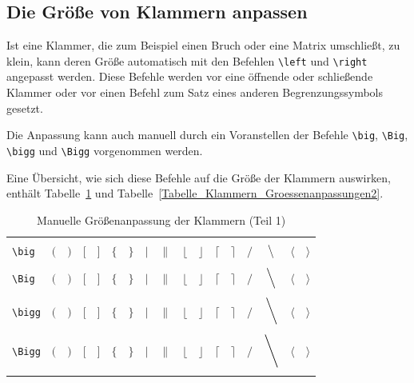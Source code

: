 \documentclass[a4paper,10pt,twoside]{scrbook}
\begin{document}
\subsection{Die Größe von Klammern anpassen}

Ist eine Klammer, die zum Beispiel einen Bruch oder eine Matrix umschließt, zu klein, kann deren 
Größe automatisch mit den Befehlen 
\verb!\left! und 
\verb!\right! 
angepasst werden. Diese Befehle werden vor eine öffnende oder schließende Klammer oder vor einen Befehl 
zum Satz eines anderen Begrenzungssymbols gesetzt.

Die Anpassung kann auch manuell durch ein Voranstellen der Befehle 
\verb!\big!,  
\verb!\Big!,
\verb!\bigg! und  
\verb!\Bigg! vorgenommen werden.

Eine Übersicht, wie sich 
diese Befehle auf die Größe der Klammern 
auswirken, enthält Tabelle~\ref{Tabelle_Klammern_Groessenanpassungen1} und Tabelle~\ref{Tabelle_Klammern_Groessenanpassungen2}.


\begin{table}[h!tb]
\centering
\caption{Manuelle Größenanpassung der Klammern (Teil 1)}
\label{Tabelle_Klammern_Groessenanpassungen1}       %
\begin{tabular}{lcccccccccccccccc}
\hline
& & & & & & & & & & & & & & & &  \\
\texttt{\textbackslash big} & $\big($ & $\big)$ & $\big[$ & $\big]$ & 
$\big\{$ & $\big\}$ & $\big|$ & $\big\|$ & 
$\big\lfloor$ & $\big\rfloor$ & $\big\lceil$ & $\big\rceil$ &
$\big/$ & $\big\backslash$ & $\big\langle$ & $\big\rangle$  \\
& & & & & & & & & & & & & & & &  \\
\texttt{\textbackslash Big} & $\Big($ & $\Big)$ & $\Big[$ & $\Big]$ & 
$\Big\{$ & $\Big\}$ & $\Big|$ & $\Big\|$ & 
$\Big\lfloor$ & $\Big\rfloor$ & $\Big\lceil$ & $\Big\rceil$ &
$\Big/$ & $\Big\backslash$ & $\Big\langle$ & $\Big\rangle$  \\
& & & & & & & & & & & & & & & &  \\
\texttt{\textbackslash bigg} & $\bigg($ & $\bigg)$ & $\bigg[$ & $\bigg]$ & 
$\bigg\{$ & $\bigg\}$ & $\bigg|$ & $\bigg\|$ & 
$\bigg\lfloor$ & $\bigg\rfloor$ & $\bigg\lceil$ & $\bigg\rceil$ &
$\bigg/$ & $\bigg\backslash$ & $\bigg\langle$ & $\bigg\rangle$ \\
& & & & & & & & & & & & & & & &  \\
\texttt{\textbackslash Bigg} & $\Bigg($ & $\Bigg)$ & $\Bigg[$ & $\Bigg]$ & 
$\Bigg\{$ & $\Bigg\}$ & $\Bigg|$ & $\Bigg\|$ & 
$\Bigg\lfloor$ & $\Bigg\rfloor$ & $\Bigg\lceil$ & $\Bigg\rceil$ &
$\Bigg/$ & $\Bigg\backslash$ & $\Bigg\langle$ & $\Bigg\rangle$  \\
& & & & & & & & & & & & & & & &  \\
\hline
\end{tabular}
\end{table}
\end{document}
